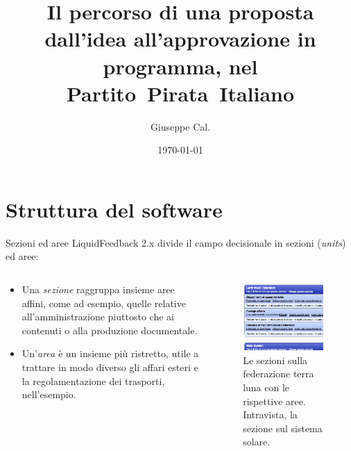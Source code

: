 \documentclass[ignorenonframetext]{beamer}\usetheme{default}
\title{Il percorso di una proposta dall'idea all'approvazione in programma, nel Partito~Pirata~Italiano}
\author{Giuseppe Cal.}
\institute{Partito Pirata Italiano -- Pirate Party of Italy}
\date{\today}
\begin{document}
\begin{frame}
\maketitle
\end{frame}

\section{Struttura del software}
\begin{frame}{Sezioni ed aree}
LiquidFeedback 2.x divide il campo decisionale in sezioni (\emph{units}) ed aree: 
\begin{columns}
\begin{column}{0.5\textwidth}
\begin{itemize}
\item Una \emph{sezione} raggruppa insieme aree affini, come ad esempio, quelle relative all'amministrazione piuttosto che ai contenuti o alla produzione documentale.
\item Un'\emph{area} \`e un insieme pi\`u ristretto, utile a trattare in modo diverso gli affari esteri e la regolamentazione dei trasporti, nell'esempio.
\end{itemize}
\end{column}
\begin{column}{0.5\textwidth}
\begin{figure}
\includegraphics[width=0.95\textwidth]{pics/unitarea}
\caption{Le sezioni sulla federazione terra luna con le rispettive aree. Intravista, la sezione sul sistema solare.}
\end{figure}
\end{column}
\end{columns}
\end{frame}
\end{document}
